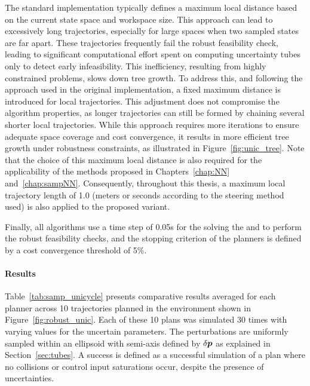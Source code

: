 The standard   implementation typically defines a maximum local distance based on the current state space and workspace size.
This approach can lead to excessively long trajectories, especially for large spaces when two sampled states are far apart.
These trajectories frequently fail the robust feasibility check, leading to significant computational effort spent on computing uncertainty tubes only to detect early infeasibility. 
This inefficiency, resulting from highly constrained problems, slows down tree growth.
To address this, and following the approach used in the original  implementation, a fixed maximum distance is introduced for local trajectories. 
This adjustment does not compromise the algorithm properties, as longer trajectories can still be formed by chaining several shorter local trajectories. 
While this approach requires more iterations to ensure adequate space coverage and cost convergence, it results in more efficient tree growth under robustness constraints, as illustrated in Figure~\ref{fig:unic_tree}.
Note that the choice of this maximum local distance is also required for the applicability of the methods proposed in Chapters~\ref{chap:NN} and~\ref{chap:sampNN}.
Consequently, throughout this thesis, a maximum local trajectory length of 1.0 (meters or seconds according to the steering method used) is also applied to the proposed  variant.

Finally, all algorithms use a time step of 0.05s for the solving the  and to perform the robust feasibility checks, and the stopping criterion of the planners is defined by a cost convergence threshold of 5\%.

\paragraph{Results}



Table~\ref{tab:samp_unicycle} presents comparative results averaged for each planner across 10 trajectories planned in the environment shown in Figure~\ref{fig:robust_unic}. 
Each of these 10 plans was simulated 30 times with varying values for the uncertain parameters.
The perturbations are uniformly sampled within an ellipsoid with semi-axis defined by $\delta \boldsymbol{p}$ as explained in Section~\ref{sec:tubes}.
A success is defined as a successful simulation of a plan where no collisions or control input saturations occur, despite the presence of uncertainties.

